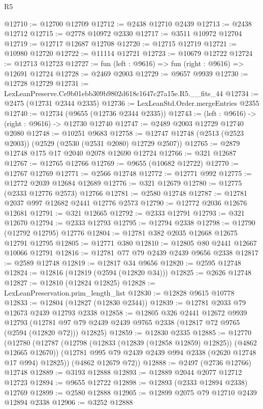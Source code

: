 \begin{lexlean}{R5}
\begin{coremodule}
@12710 := @12700 @12709
@12712 := @2438 @12710 @2439
@12713 := @2438 @12712
@12715 := @2778 @10972 @2330
@12717 := @3511 @10972 @12704
@12719 := @12717 @12687 @12708
@12720 := @12715 @12719
@12721 := @10980 @12720
@12722 := @11114 @12721
@12723 := @10679 @12722
@12724 := @12713 @12723
@12727 := fun (left : @9616) => fun (right : @9616) => @12691 @12724
@12728 := @2469 @2003
@12729 := @9657 @9939
@12730 := @12728 @12729
@12731 := LexLeanPreserve.Ce9b01ebb309b9802d618c1647c27a15e.R5.__fits_44
@12734 := @2475 (@12731 @2344 @2335)
@12736 := LexLeanStd.Order.mergeEntries @2355
@12740 := @12734 (@9655 (@12736 @2344 @2335))
@12743 := (left : @9616) -> (right : @9616) -> @12730 @12740
@12747 := @2489 @2003 @12729 @12740 @2080
@12748 := @10251 @9683
@12758 := @12747 @12748 (@2513 (@2523 @2003)) (@2529 (@2530 (@2531 @2080) @12729 @2507))
@12765 := @2879 @12748 @175 @17 @2040 @2078 @12690 @12724
@12766 := @321 @12687
@12767 := @12765 @12766
@12769 := @9655 (@10682 @12722)
@12770 := @12767 @12769
@12771 := @2566 @12748
@12772 := @12771 @992
@12775 := @12772 @2039 @12684 @12689
@12776 := @321 @12679
@12780 := @12775 (@2333 @12776 @2573) @12766
@12781 := @2580 @12748
@12787 := @12781 @2037 @997 @12682 @2441 @12776 @2573
@12790 := @12772 @2036 @12676 @12681
@12791 := @321 @12665
@12792 := @2333 @12791
@12793 := @321 @12670
@12794 := @2333 @12793
@12795 := @12794 @2338
@12798 := @12790 (@12792 @12795) @12776
@12804 := @12781 @382 @2035 @12668 @12675 @12791 @12795
@12805 := @12771 @380
@12810 := @12805 @80 @2441 @12667 @10066 @12791
@12816 := @12781 @77 @79 @2439 @2439 @9656 @2338
@12817 := @2589 @12748
@12819 := @12817 @34 @9656
@12820 := @2595 @12748
@12824 := @12816 (@12819 (@2594 (@12820 @34)))
@12825 := @2626 @12748
@12827 := @12810 (@12824 @12825)
@12828 := LexLeanPreservation.prim_length_list
@12830 := @12828 @9615 @10778
@12833 := @12804 (@12827 (@12830 @2344))
@12839 := @12781 @2033 @79 @12673 @2439 @12793 @2338
@12858 := @12805
    @326
    @2441
    @12672
    @9939
    @12793
    (@12781 @97 @79 @2439 @2439 @9765 @2338 (@12817 @72 @9765 (@2594 (@12820 @72))) @12825)
@12859 := @12830 @2335
@12885 := @12770
    (@12780
      (@12787
        (@12798 (@12833 (@12839 (@12858 @12859) @12825)) (@4862 @12665 @12670))
        (@12781 @995 @79 @2439 @2439 @994 @2338 (@2620 @12748 @17 @994) @12825))
      (@4862 @12679 @72))
@12888 := @2497 (@2736 @12766) @12748
@12889 := @3193 @12888
@12893 := @12889 @2044 @2077 @12712 @12723
@12894 := @9655 @12722
@12898 := @12893 (@2333 @12894 @2338) @12769
@12899 := @2580 @12888
@12905 := @12899 @2075 @79 @12710 @2439 @12894 @2338
@12906 := @3252 @12888

\end{coremodule}
\end{lexlean}
